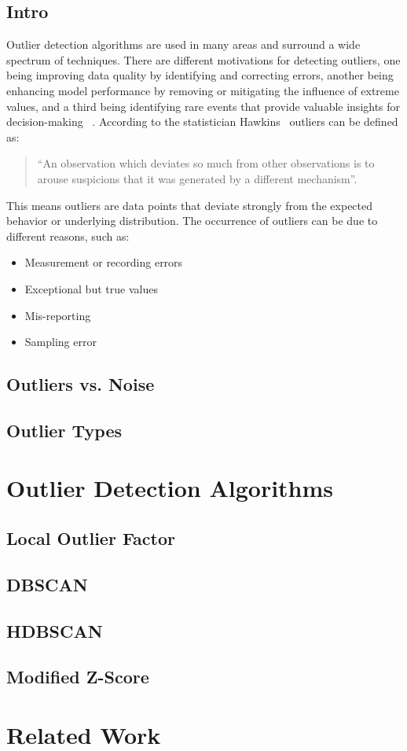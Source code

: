 \subsection{Intro}
Outlier detection algorithms are used in many areas and surround a wide spectrum of techniques. There are different motivations for detecting outliers, one being improving data quality by identifying and correcting errors, another being enhancing model performance by removing or mitigating the influence of extreme values, and a third being identifying rare events that provide valuable insights for decision-making ~\cite{boukerche_outlier_2020}. According to the statistician Hawkins~\cite{hawkins_identification_1980} outliers can be defined as:
\begin{quote}
“An observation which deviates so much from other observations is to arouse suspicions that it was generated by a different mechanism”.
\end{quote}
This means outliers are data points that deviate strongly from the expected behavior or underlying distribution. The occurrence of outliers can be due to different reasons, such as: 
\begin{itemize}
    \item Measurement or recording errors
    \item Exceptional but true values
    \item Mis-reporting
    \item Sampling error
\end{itemize}




\subsection{Outliers vs. Noise}
\subsection{Outlier Types}

\section{Outlier Detection Algorithms}

\subsection{Local Outlier Factor}

\subsection{DBSCAN}

\subsection{HDBSCAN}

\subsection{Modified Z-Score}

\section{Related Work}


